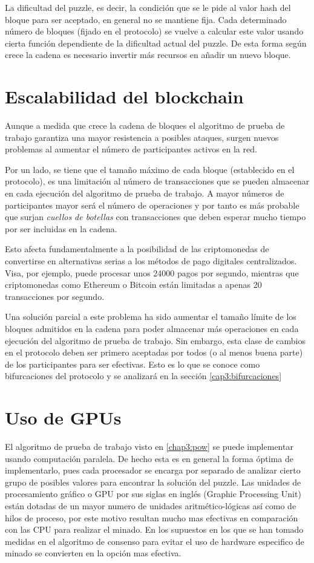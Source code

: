 La dificultad del puzzle, es decir, la condición que se le pide al valor hash del bloque para ser aceptado, en general no se mantiene fija. Cada determinado número de bloques (fijado en el protocolo) se vuelve a calcular este valor usando cierta función dependiente de la dificultad actual del puzzle. De esta forma según crece la cadena es necesario invertir más recursos en añadir un nuevo bloque.

\section{Escalabilidad del blockchain}
Aunque a medida que crece la cadena de bloques el algoritmo de prueba de trabajo garantiza una mayor resistencia a posibles ataques, surgen nuevos problemas al aumentar el número de participantes activos en la red.

Por un lado, se tiene que el tamaño máximo de cada bloque (establecido en el protocolo), es una limitación al número de transacciones que se pueden almacenar en cada ejecución del algoritmo de prueba de trabajo. A mayor números de participantes mayor será el número de operaciones y por tanto es más probable que surjan \textit{cuellos de botellas} con transacciones que deben esperar mucho tiempo por ser incluidas en la cadena.

Esto afecta fundamentalmente a la posibilidad de las criptomonedas de convertirse en alternativas serias a los métodos de pago digitales centralizados. Visa, por ejemplo, puede procesar unos 24000 pagos por segundo, mientras que criptomonedas como Ethereum o Bitcoin están limitadas a apenas 20 transacciones por segundo.\citep{scalability}

Una solución parcial a este problema ha sido aumentar el tamaño límite de los bloques admitidos en la cadena para poder almacenar más operaciones en cada ejecución del algoritmo de prueba de trabajo. Sin embargo, esta clase de cambios en el protocolo deben ser primero aceptadas por todos (o al menos buena parte) de los participantes para ser efectivas. Esto es lo que se conoce como bifurcaciones del protocolo y se analizará en la sección \ref{cap3:bifurcaciones}

\section{Uso de GPUs} %
El algoritmo de prueba de trabajo visto en \ref{chap3:pow} se puede implementar usando computación paralela. De hecho esta es en general la forma óptima\citep{paralel_gpu} de implementarlo, pues cada procesador se encarga por separado de analizar cierto grupo de posibles valores para encontrar la solución del puzzle. Las unidades de procesamiento gráfico o GPU por sus siglas en inglés (Graphic Processing Unit) están dotadas de un mayor numero de unidades aritmético-lógicas así como de hilos de proceso, por este motivo resultan mucho mas efectivas en comparación con las CPU para realizar el minado. En los supuestos en los que se han tomado medidas en el algoritmo de consenso para evitar el uso de hardware especifico de minado se convierten en la opción mas efectiva.


